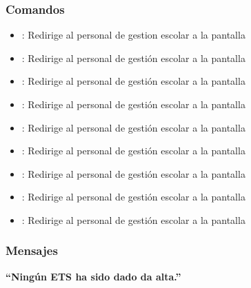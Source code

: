 \subsubsection{Comandos}
\begin{itemize}
    \item {}: Redirige al personal de gestion escolar a la pantalla 
    
    \item {}: Redirige al personal de gestión escolar a la pantalla 
    \item {}: Redirige al personal de gestión escolar a la pantalla 
    
    \item {}: Redirige al personal de gestión escolar a la pantalla 
    \item {}: Redirige al personal de gestión escolar a la pantalla 
    
    \item {}: Redirige al personal de gestión escolar a la pantalla 
    \item {}: Redirige al personal de gestión escolar a la pantalla 
    
    \item {}: Redirige al personal de gestión escolar a la pantalla 
    \item {}: Redirige al personal de gestión escolar a la pantalla 
\end{itemize}

\subsubsection{Mensajes}

\begin{Citemize}
    \item {\bf  ``Ningún ETS ha sido dado da alta.''}
\end{Citemize}

